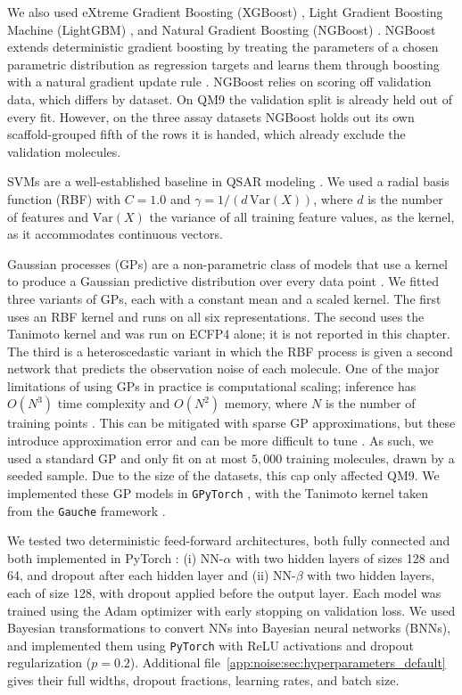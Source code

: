 We also used eXtreme Gradient Boosting (XGBoost) \citep{Chen2016}, Light Gradient Boosting Machine (LightGBM) \citep{ke2017lightgbm}, and Natural Gradient Boosting (NGBoost) \citep{Duan2020}. NGBoost extends deterministic gradient boosting by treating the parameters of a chosen parametric distribution as regression targets and learns them through boosting with a natural gradient update rule \citep{Duan2020}. NGBoost relies on scoring off validation data, which differs by dataset. On QM9 the validation split is already held out of every fit. However, on the three assay datasets NGBoost holds out its own scaffold-grouped fifth of the rows it is handed, which already exclude the validation molecules.

SVMs are a well-established baseline in QSAR modeling \citep{Vapnik1995, Cortes2015}. We used a radial basis function (RBF) with $C = 1.0$ and $\gamma = 1/(d\,\mathrm{Var}(X))$, where $d$ is the number of features and $\mathrm{Var}(X)$ the variance of all training feature values, as the kernel, as it accommodates continuous vectors. 

Gaussian processes (GPs) are a non-parametric class of models that use a kernel to produce a Gaussian predictive distribution over every data point \citep{Obrezanova2007, Rasmussen2005}. We fitted three variants of GPs, each with a constant mean and a scaled kernel. The first uses an RBF kernel and runs on all six representations. The second uses the Tanimoto kernel \citep{Ralaivola2005, moss2020} and was run on ECFP4 alone; it is not reported in this chapter. The third is a heteroscedastic variant in which the RBF process is given a second network that predicts the observation noise of each molecule. One of the major limitations of using GPs in practice is computational scaling; inference has $O(N^3)$ time complexity and $O(N^2)$ memory, where $N$ is the number of training points \citep{Rasmussen2005}. This can be mitigated with sparse GP approximations, but these introduce approximation error and can be more difficult to tune \citep{quinonero2005}. As such, we used a standard GP and only fit on at most $5{,}000$ training molecules, drawn by a seeded sample. Due to the size of the datasets, this cap only affected QM9. We implemented these GP models in \texttt{GPyTorch} \citep{gpytorch}, with the Tanimoto kernel taken from the \texttt{Gauche} framework \citep{gauche}.

We tested two deterministic feed-forward architectures, both fully connected and both implemented in PyTorch \citep{Paszke2019}: (i) NN-$\alpha$ with two hidden layers of sizes 128 and 64, and dropout after each hidden layer and (ii) NN-$\beta$ with two hidden layers, each of size 128, with dropout applied before the output layer. Each model was trained using the Adam optimizer with early stopping on validation loss. We used Bayesian transformations to convert NNs into Bayesian neural networks (BNNs), and implemented them using \texttt{PyTorch} \citep{Paszke2019} with ReLU activations and dropout regularization ($p=0.2$). Additional file~\ref{app:noise:sec:hyperparameters_default} gives their full widths, dropout fractions, learning rates, and batch size.

